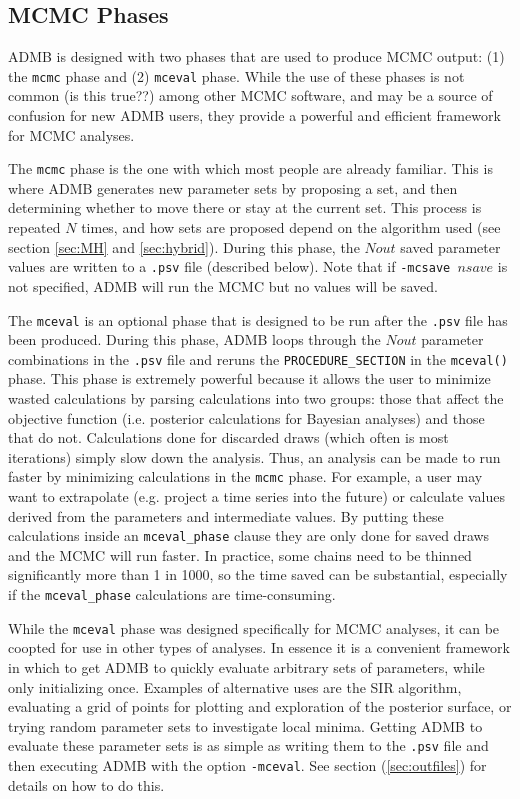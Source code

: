 \documentclass{article}\usepackage[]{graphicx}\usepackage[]{color}
\begin{document}
\subsection{MCMC Phases}
ADMB is designed with two phases that are used to produce
MCMC output: (1) the \texttt{mcmc} phase and (2)
\texttt{mceval} phase. While the use of these phases is not
common (is this true??) among other MCMC software, and may
be a source of confusion for new ADMB users, they provide a
powerful and efficient framework for MCMC analyses.

The \texttt{mcmc} phase is the one with which most people
are already familiar. This is where ADMB generates new
parameter sets by proposing a set, and then determining
whether to move there or stay at the current set. This
process is repeated $N$ times, and how sets are proposed
depend on the algorithm used (see section \ref{sec:MH} and
\ref{sec:hybrid}). During this phase, the $Nout$ saved
parameter values are written to a \texttt{.psv} file
(described below). Note that if \texttt{-mcsave $nsave$} is
not specified, ADMB will run the MCMC but no values will be
saved.

The \texttt{mceval} is an optional phase that is designed to
be run after the \texttt{.psv} file has been
produced. During this phase, ADMB loops through the $Nout$
parameter combinations in the \texttt{.psv} file and reruns
the \texttt{PROCEDURE\_SECTION} in the \texttt{mceval()}
phase. This phase is extremely powerful because it allows
the user to minimize wasted calculations by parsing
calculations into two groups: those that affect the
objective function (i.e. posterior calculations for Bayesian
analyses) and those that do not. Calculations done for
discarded draws (which often is most iterations) simply slow
down the analysis. Thus, an analysis can be made to run
faster by minimizing calculations in the \texttt{mcmc}
phase.  For example, a user may want to extrapolate
(e.g. project a time series into the future) or calculate
values derived from the parameters and intermediate
values. By putting these calculations inside an
\texttt{mceval\_phase} clause they are only done for saved
draws and the MCMC will run faster. In practice, some chains
need to be thinned significantly more than 1 in 1000, so the
time saved can be substantial, especially if the
\texttt{mceval\_phase} calculations are time-consuming.

While the \texttt{mceval} phase was designed specifically
for MCMC analyses, it can be coopted for use in other types
of analyses. In essence it is a convenient framework in
which to get ADMB to quickly evaluate arbitrary sets of
parameters, while only initializing once. Examples of
alternative uses are the SIR algorithm,
evaluating a grid of points for plotting and exploration of
the posterior surface, or trying random parameter sets to
investigate local minima. Getting ADMB to evaluate these
parameter sets is as simple as writing them to the
\texttt{.psv} file and then executing ADMB with the option
\texttt{-mceval}. See section (\ref{sec:outfiles}) for
details on how to do this.
\end{document}
